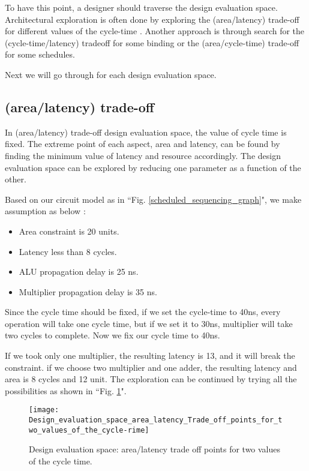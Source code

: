 To have this point, a designer should traverse the design evaluation space. Architectural exploration is often done by exploring the (area/latency) trade-off for different values of the cycle-time \cite{main}. Another approach is through search for the (cycle-time/latency) tradeoff for some binding or the (area/cycle-time) trade-off for some schedules.

Next we will go through for each design evaluation space.

\subsection{(area/latency) trade-off}

In (area/latency) trade-off design evaluation space, the value of cycle time is fixed. The extreme point of each aspect, area and latency, can be found by finding the minimum value of latency and resource accordingly. The design evaluation space can be explored by reducing one parameter as a function of the other. 

Based on our circuit model as in ``Fig. \ref{scheduled_sequencing_graph}", we make assumption as below : 
\begin{itemize}
    \item Area constraint is 20 units.
    \item Latency less than 8 cycles.
    \item ALU propagation delay is 25 ns.
    \item Multiplier propagation delay is 35 ns.
\end{itemize}

Since the cycle time should be fixed, if we set the cycle-time to 40ns, every operation will take one cycle time, but if we set it to 30ns, multiplier will take two cycles to complete. Now we fix our cycle time to 40ns.

If we took only one multiplier, the resulting latency is 13, and it will break the constraint. if we choose two multiplier and one adder, the resulting latency and area is 8 cycles and 12 unit. The exploration can be continued by trying all the possibilities as shown in ``Fig. \ref{Design_evaluation_space_area_latency_Trade_off_points_for_two_values_of_the_cycle-rime}".

\begin{figure}[ht]
    \centering
    \texttt{[image: Design\_evaluation\_space\_area\_latency\_Trade\_off\_points\_for\_two\_values\_of\_the\_cycle-rime]}
    \caption{Design evaluation space: area/latency trade off points for two values of the cycle time. \cite{main}}
    \label{Design_evaluation_space_area_latency_Trade_off_points_for_two_values_of_the_cycle-rime}
\end{figure}


